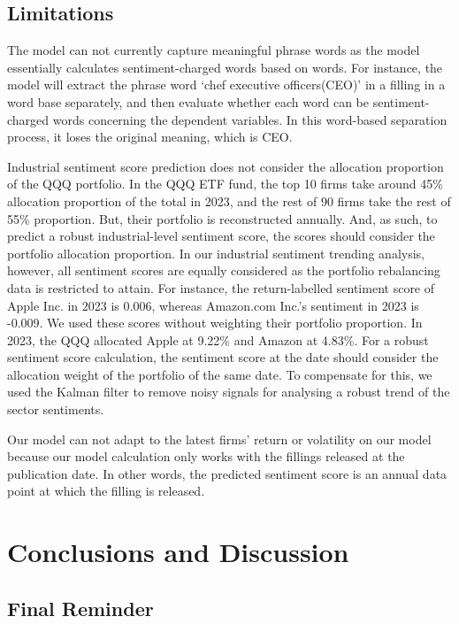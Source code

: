 \documentclass[logo,bsc,singlespacing,parskip]{infthesis}
\begin{document}
\section{Limitations}
The model can not currently capture meaningful phrase words as the model essentially calculates sentiment-charged words based on words. For instance, the model will extract the phrase word ‘chef executive officers(CEO)’ in a filling in a word base separately, and then evaluate whether each word can be sentiment-charged words concerning the dependent variables. In this word-based separation process, it loses the original meaning, which is CEO.

Industrial sentiment score prediction does not consider the allocation proportion of the QQQ portfolio. In the QQQ ETF fund, the top 10 firms take around 45\% allocation proportion of the total in 2023, and the rest of 90 firms take the rest of 55\% proportion. But, their portfolio is reconstructed annually. And, as such, to predict a robust industrial-level sentiment score, the scores should consider the portfolio allocation proportion. In our industrial sentiment trending analysis, however, all sentiment scores are equally considered as the portfolio rebalancing data is restricted to attain. For instance, the return-labelled sentiment score of Apple Inc. in 2023 is 0.006, whereas Amazon.com Inc.’s sentiment in 2023 is -0.009. We used these scores without weighting their portfolio proportion. In 2023, the QQQ allocated Apple at 9.22\% and Amazon at 4.83\%. For a robust sentiment score calculation, the sentiment score at the date should consider the allocation weight of the portfolio of the same date. To compensate for this, we used the Kalman filter to remove noisy signals for analysing a robust trend of the sector sentiments.

Our model can not adapt to the latest firms’ return or volatility on our model because our model calculation only works with the fillings released at the publication date. In other words, the predicted sentiment score is an annual data point at which the filling is released.

\chapter{Conclusions and Discussion}

\section{Final Reminder}
\end{document}
